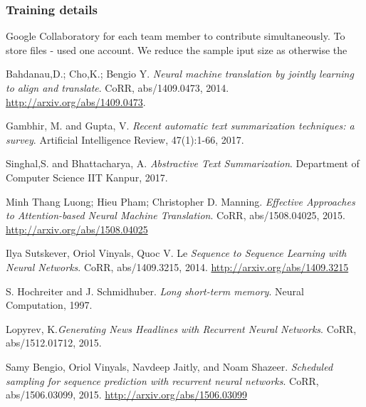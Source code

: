 \subsubsection{Training details}
Google Collaboratory for each team member to contribute simultaneously.
To store files - used one account.
We reduce the sample iput size as otherwise the 


\begin{thebibliography}{9}
	Bahdanau,D.; Cho,K.; Bengio Y. \textit{Neural machine translation by jointly learning to align and translate}. CoRR, abs/1409.0473, 2014. \url{ http://arxiv.org/abs/1409.0473}.
	
	Gambhir, M. and Gupta, V. \textit{Recent automatic text summarization techniques: a survey}. Artificial Intelligence Review, 47(1):1-66, 2017.
	
	Singhal,S. and Bhattacharya, A. \textit{Abstractive Text Summarization}. Department of Computer Science IIT Kanpur, 2017.
	
	Minh Thang Luong; Hieu Pham; Christopher D. Manning. \textit{Effective Approaches to Attention-based Neural Machine Translation}. CoRR, abs/1508.04025, 2015. \url{http://arxiv.org/abs/1508.04025}
	
	Ilya Sutskever, Oriol Vinyals, Quoc V. Le \textit{Sequence to Sequence Learning with Neural Networks}. CoRR, abs/1409.3215, 2014. \url{http://arxiv.org/abs/1409.3215}
	
	S. Hochreiter and J. Schmidhuber. \textit{Long short-term memory}. Neural Computation, 1997.
		 
	Lopyrev, K.\textit{Generating News Headlines with Recurrent Neural 	Networks}. CoRR, abs/1512.01712, 2015.
	
	Samy Bengio, Oriol Vinyals, Navdeep Jaitly, and Noam Shazeer. \textit{Scheduled sampling for sequence
prediction with recurrent neural networks}. CoRR, abs/1506.03099, 2015. \url{http://arxiv.org/abs/1506.03099}
	
	

\end{thebibliography}


